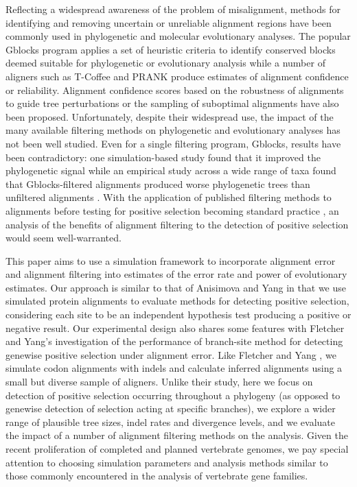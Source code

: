 \documentclass{article}
\begin{document}
Reflecting a widespread awareness of the problem of misalignment,
methods for identifying and removing uncertain or unreliable alignment
regions have been commonly used in phylogenetic and molecular
evolutionary analyses. The popular Gblocks program applies a set of
heuristic criteria to identify conserved blocks deemed suitable for
phylogenetic or evolutionary analysis \citep{Castresana2000Selection}
while a number of aligners such as T-Coffee
\citep{Notredame2000TCoffee} and PRANK \citep{Loytynoja2005From}
produce estimates of alignment confidence or reliability. Alignment
confidence scores based on the robustness of alignments to guide tree
perturbations \citep{Penn2010Alignment} or the sampling of suboptimal
alignments \citep{Kim2011PSAR} have also been proposed. Unfortunately,
despite their widespread use, the impact of the many available
filtering methods on phylogenetic and evolutionary analyses has not
been well studied. Even for a single filtering program, Gblocks,
results have been contradictory: one simulation-based study found that
it improved the phylogenetic signal \citep{Talavera2007Improvement}
while an empirical study across a wide range of taxa found that
Gblocks-filtered alignments produced worse phylogenetic trees than
unfiltered alignments \citep{Dessimoz2010Phylogenetic}. With the
application of published filtering methods to alignments before
testing for positive selection becoming standard practice
\citep{Studer2008Pervasive,Aguileta2009Rapidly}, an analysis of the
benefits of alignment filtering to the detection of positive selection
would seem well-warranted.

This paper aims to use a simulation framework to incorporate alignment
error and alignment filtering into estimates of the error rate and
power of \sw evolutionary estimates. Our approach is similar to that
of Anisimova and Yang \citeyearpar{Anisimova2002Accuracy} in that we
use simulated protein alignments to evaluate methods for detecting \sw
positive selection, considering each site to be an independent
hypothesis test producing a positive or negative result. Our
experimental design also shares some features with Fletcher and Yang's
\citeyearpar{Fletcher2010Effect} investigation of the performance of
branch-site method for detecting genewise positive selection under
alignment error. Like Fletcher and Yang
\citeyearpar{Fletcher2010Effect}, we simulate codon alignments with
indels and calculate inferred alignments using a small but diverse
sample of aligners. Unlike their study, here we focus on \sw detection
of positive selection occurring throughout a phylogeny (as opposed to
genewise detection of selection acting at specific branches), we
explore a wider range of plausible tree sizes, indel rates and
divergence levels, and we evaluate the impact of a number of alignment
filtering methods on the \sw analysis. Given the recent proliferation
of completed and planned vertebrate genomes, we pay special attention
to choosing simulation parameters and analysis methods similar to
those commonly encountered in the \sw analysis of vertebrate gene
families.
\end{document}
